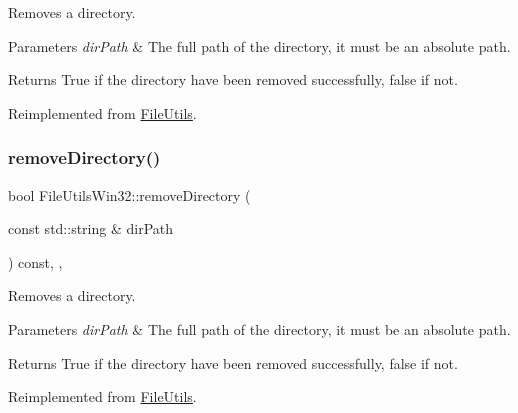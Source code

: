Removes a directory.


\begin{DoxyParams}{Parameters}
{\em dir\+Path} & The full path of the directory, it must be an absolute path. \\
\hline
\end{DoxyParams}
\begin{DoxyReturn}{Returns}
True if the directory have been removed successfully, false if not. 
\end{DoxyReturn}


Reimplemented from \hyperlink{classFileUtils_ad64d866c014013817c54582924f9592e}{File\+Utils}.

\mbox{\label{classFileUtilsWin32_ab190878679d22943a4b167fee6d200ee}} 
\subsubsection{\texorpdfstring{remove\+Directory()}{removeDirectory()}\hspace{0.1cm}{\footnotesize\ttfamily [2/2]}}
{\footnotesize\ttfamily bool File\+Utils\+Win32\+::remove\+Directory (\begin{DoxyParamCaption}\item[{const std\+::string \&}]{dir\+Path }\end{DoxyParamCaption}) const\hspace{0.3cm}{\ttfamily [override]}, {\ttfamily [protected]}, {\ttfamily [virtual]}}

Removes a directory.


\begin{DoxyParams}{Parameters}
{\em dir\+Path} & The full path of the directory, it must be an absolute path. \\
\hline
\end{DoxyParams}
\begin{DoxyReturn}{Returns}
True if the directory have been removed successfully, false if not. 
\end{DoxyReturn}


Reimplemented from \hyperlink{classFileUtils_a0ced661e913489e0a86ef0273c0fb90f}{File\+Utils}.

\mbox{\label{classFileUtilsWin32_aab51310dbc155b73cb9f3d4f3a918d36}} 
